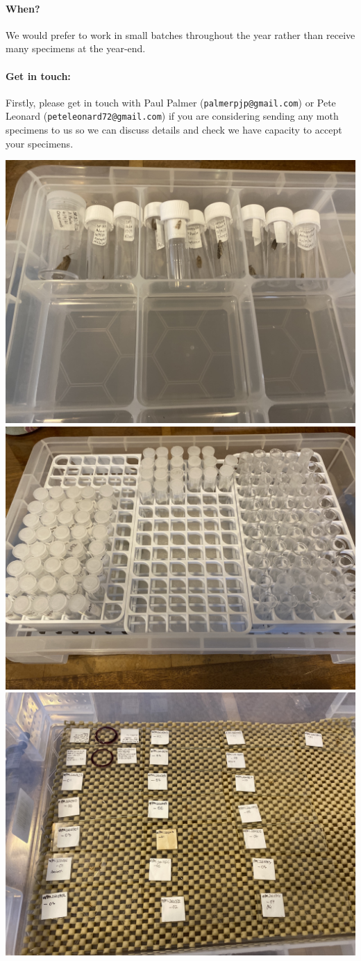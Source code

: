 \documentclass[12pt]{article}
\begin{document}
\paragraph{When?} We would prefer to work in small batches throughout the year rather than receive many specimens at the year-end. 


	\paragraph{Get in touch:} Firstly, please get in touch with Paul Palmer \newline (\texttt{palmerpjp@gmail.com}) or Pete Leonard (\texttt{peteleonard72@gmail.com}) if  you are considering sending  any moth specimens to us so we can discuss details and check we have capacity to accept your specimens. 

	\begin{center}
	\centering
	\includegraphics[width=0.3\linewidth]{images/specimens}\hfill
	\includegraphics[width=.3\textwidth]{images/prepared}\hfill
	\includegraphics[width=.3\textwidth]{images/slides}\hfill
	\label{InternalLabelPlease}
\end{center}
\end{document}
